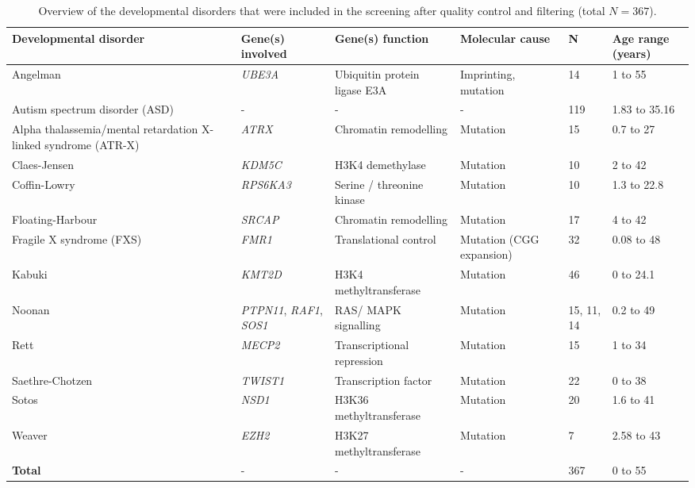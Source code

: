 \begin{table}
	\small
	\begin{tabular}{ p{4cm} p{2cm} p{2cm} p{2cm} p{1cm} p{2cm} }
		\toprule
		\textbf{Developmental disorder} & \textbf{Gene(s) involved} & \textbf{Gene(s) function} & \textbf{Molecular cause} & \textbf{N} & \textbf{Age range (years)} \\
		\midrule
		Angelman & \textit{UBE3A} & Ubiquitin protein ligase E3A & Imprinting, mutation & 14 & 1 to 55 \\
		\midrule
		Autism spectrum disorder (ASD) & - & - & - & 119 & 1.83 to 35.16 \\
		\midrule
		Alpha thalassemia/mental retardation X-linked syndrome (ATR-X) & \textit{ATRX} &Chromatin remodelling & Mutation & 15 & 0.7 to 27 \\
		\midrule
		Claes-Jensen & \textit{KDM5C} & H3K4 demethylase & Mutation & 10 & 2 to 42 \\
		\midrule
		Coffin-Lowry & \textit{RPS6KA3} & Serine / threonine kinase & Mutation & 10 & 1.3 to 22.8 \\
		\midrule
		Floating-Harbour & \textit{SRCAP} & Chromatin remodelling & Mutation & 17 & 4 to 42 \\
		\midrule
		Fragile X syndrome (FXS) & \textit{FMR1} & Translational control & Mutation (CGG expansion) & 32 & 0.08 to 48 \\
		\midrule
		Kabuki & \textit{KMT2D} & H3K4 methyltransferase & Mutation & 46 & 0 to 24.1 \\
		\midrule
		Noonan & \textit{PTPN11}, \textit{RAF1}, \textit{SOS1} & RAS/ MAPK signalling & Mutation & 15, 11, 14 & 0.2 to 49 \\
		\midrule
		Rett & \textit{MECP2} & Transcriptional repression & Mutation & 15 & 1 to 34 \\
		\midrule
		Saethre-Chotzen & \textit{TWIST1} & Transcription factor & Mutation & 22 & 0 to 38 \\
		\midrule
		Sotos & \textit{NSD1} & H3K36 methyltransferase & Mutation & 20 & 1.6 to 41 \\
		\midrule
		Weaver & \textit{EZH2} & H3K27 methyltransferase & Mutation & 7 & 2.58 to 43 \\
		\midrule
		\textbf{Total} & - & - & - & 367 & 0 to 55  \\ 
		\bottomrule
	\end{tabular}
	\vspace*{3mm}
	\caption[Overview of the developmental disorders that were included in the screening]{Overview of the developmental disorders that were included in the screening after quality control and filtering (total $N=367$).}
	\label{table:c3_table1}
\end{table} 

